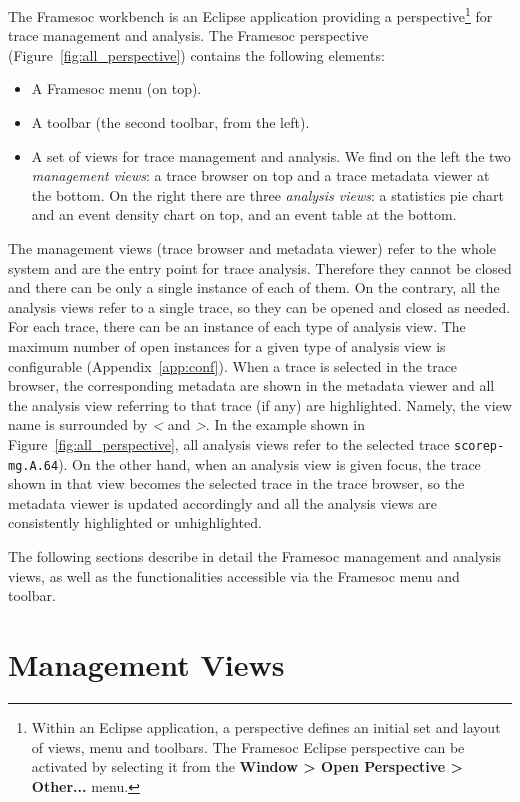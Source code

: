 \documentclass[twoside]{article}
\begin{document}
\begin{sloppypar}
The Framesoc workbench is an Eclipse application providing a perspective\footnote{Within an Eclipse application, a perspective defines an initial set and layout of views, menu and toolbars. The Framesoc Eclipse perspective can be activated by selecting it from the \textbf{Window > Open Perspective > Other...} menu.} for trace management and analysis.
The Framesoc perspective (Figure~\ref{fig:all_perspective}) contains the following elements:
\begin{itemize}
 \item A Framesoc menu (on top).
 \item A toolbar (the second toolbar, from the left).
 \item A set of views for trace management and analysis. We find on the left the two \emph{management views}: a trace browser on top and a trace metadata viewer at the bottom. On the right there are three \emph{analysis views}: a statistics pie chart and an event density chart on top, and an event table at the bottom. 
\end{itemize}

The management views (trace browser and metadata viewer) refer to the whole system and are the entry point for trace analysis.
Therefore they cannot be closed and there can be only a single instance of each of them.
On the contrary, all the analysis views refer to a single trace, so they can be opened and closed as needed. 
For each trace, there can be an instance of each type of analysis view. 
The maximum number of open instances for a given type of analysis view is configurable (Appendix~\ref{app:conf}).
When a trace is selected in the trace browser, the corresponding metadata are shown in the metadata viewer and all the analysis view referring to that trace (if any) are highlighted. Namely, the view name is surrounded by \emph{<} and \emph{>}. 
In the example shown in Figure~\ref{fig:all_perspective}, all analysis views refer to the selected trace \texttt{scorep-mg.A.64}).
On the other hand, when an analysis view is given focus, the trace shown in that view becomes the selected trace in the trace browser, so the metadata viewer is updated accordingly and all the analysis views are consistently highlighted or unhighlighted. 

The following sections describe in detail the Framesoc management and analysis views, as well as the functionalities accessible via the Framesoc menu and toolbar.

\section{Management Views}
\label{sec:management}


\end{sloppypar}
\end{document}
